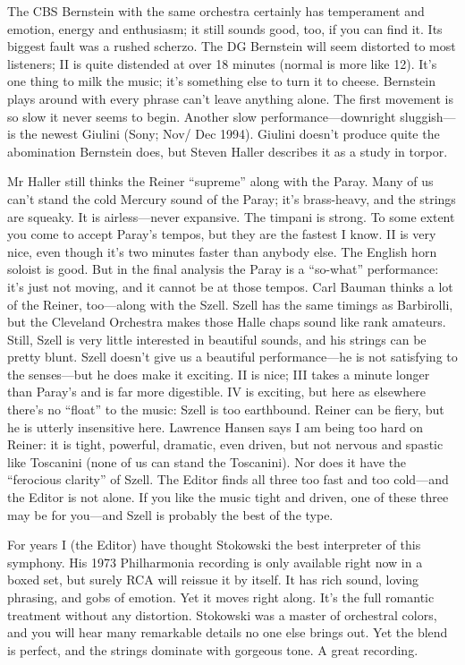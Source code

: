 \documentclass[12pt]{article}%
\begin{document}
The CBS Bernstein with the same orchestra certainly has temperament and emotion, energy and enthusiasm; it still sounds good, too, if you can find it. Its biggest fault was a rushed
scherzo. The DG Bernstein will seem distorted to most listeners; II is quite distended at over 18 minutes (normal is more like 12). It's one thing to milk the music; it's something else to turn it to cheese. Bernstein plays around with every phrase can't leave anything alone. The first movement is so slow it never seems to begin. Another slow performance---downright sluggish---is the newest Giulini (Sony; Nov/ Dec 1994). Giulini doesn't produce quite the abomination Bernstein does, but Steven Haller describes it as a study in torpor.

Mr Haller still thinks the Reiner ``supreme'' along with the Paray. Many of us can't stand the cold Mercury sound of the Paray; it's brass-heavy, and the strings are squeaky. It is airless---never expansive. The timpani is strong. To some extent you come to accept Paray's tempos, but they are the fastest I know. II is very nice, even though it's two minutes faster than anybody else. The English horn soloist is good. But in the final analysis the Paray is a ``so-what'' performance: it's just not moving, and it cannot be at those tempos. Carl Bauman thinks a lot of the Reiner, too---along with the Szell. Szell has the same timings as Barbirolli, but the Cleveland Orchestra makes those Halle chaps sound like rank amateurs. Still, Szell is very little interested in beautiful sounds, and his strings can be pretty blunt. Szell doesn't give us a beautiful performance---he is not satisfying to the senses---but he does make it exciting. II is nice; III takes a minute longer than Paray's and is far more digestible. IV is exciting, but here as elsewhere there's no
``float'' to the music: Szell is too earthbound.
Reiner can be fiery, but he is utterly insensitive here. Lawrence Hansen says I am being too hard on Reiner: it is tight, powerful, dramatic, even driven, but not nervous and spastic like Toscanini (none of us can stand the Toscanini). Nor does it have the ``ferocious clarity'' of Szell. The Editor finds all three too fast and too cold---and the Editor is not alone. If you like the music tight and driven, one of these three may be for you---and Szell is probably the best of the type.

For years I (the Editor) have thought Stokowski the best interpreter of this symphony.
His 1973 Philharmonia recording is only available right now in a boxed set, but surely RCA will reissue it by itself. It has rich sound, loving phrasing, and gobs of emotion. Yet it moves right along. It's the full romantic treatment without any distortion. Stokowski was a master of orchestral colors, and you will hear many remarkable details no one else brings out. Yet the blend is perfect, and the strings dominate with gorgeous tone. A great recording.
\end{document}
